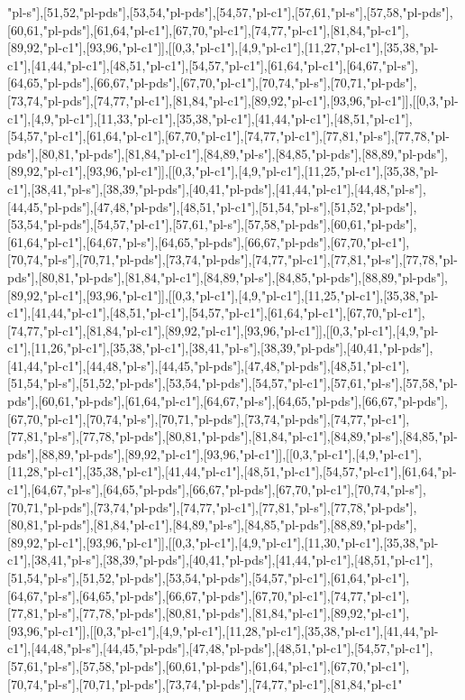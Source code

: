 "pl-s"],[51,52,"pl-pds"],[53,54,"pl-pds"],[54,57,"pl-c1"],[57,61,"pl-s"],[57,58,"pl-pds"],[60,61,"pl-pds"],[61,64,"pl-c1"],[67,70,"pl-c1"],[74,77,"pl-c1"],[81,84,"pl-c1"],[89,92,"pl-c1"],[93,96,"pl-c1"]],[[0,3,"pl-c1"],[4,9,"pl-c1"],[11,27,"pl-c1"],[35,38,"pl-c1"],[41,44,"pl-c1"],[48,51,"pl-c1"],[54,57,"pl-c1"],[61,64,"pl-c1"],[64,67,"pl-s"],[64,65,"pl-pds"],[66,67,"pl-pds"],[67,70,"pl-c1"],[70,74,"pl-s"],[70,71,"pl-pds"],[73,74,"pl-pds"],[74,77,"pl-c1"],[81,84,"pl-c1"],[89,92,"pl-c1"],[93,96,"pl-c1"]],[[0,3,"pl-c1"],[4,9,"pl-c1"],[11,33,"pl-c1"],[35,38,"pl-c1"],[41,44,"pl-c1"],[48,51,"pl-c1"],[54,57,"pl-c1"],[61,64,"pl-c1"],[67,70,"pl-c1"],[74,77,"pl-c1"],[77,81,"pl-s"],[77,78,"pl-pds"],[80,81,"pl-pds"],[81,84,"pl-c1"],[84,89,"pl-s"],[84,85,"pl-pds"],[88,89,"pl-pds"],[89,92,"pl-c1"],[93,96,"pl-c1"]],[[0,3,"pl-c1"],[4,9,"pl-c1"],[11,25,"pl-c1"],[35,38,"pl-c1"],[38,41,"pl-s"],[38,39,"pl-pds"],[40,41,"pl-pds"],[41,44,"pl-c1"],[44,48,"pl-s"],[44,45,"pl-pds"],[47,48,"pl-pds"],[48,51,"pl-c1"],[51,54,"pl-s"],[51,52,"pl-pds"],[53,54,"pl-pds"],[54,57,"pl-c1"],[57,61,"pl-s"],[57,58,"pl-pds"],[60,61,"pl-pds"],[61,64,"pl-c1"],[64,67,"pl-s"],[64,65,"pl-pds"],[66,67,"pl-pds"],[67,70,"pl-c1"],[70,74,"pl-s"],[70,71,"pl-pds"],[73,74,"pl-pds"],[74,77,"pl-c1"],[77,81,"pl-s"],[77,78,"pl-pds"],[80,81,"pl-pds"],[81,84,"pl-c1"],[84,89,"pl-s"],[84,85,"pl-pds"],[88,89,"pl-pds"],[89,92,"pl-c1"],[93,96,"pl-c1"]],[[0,3,"pl-c1"],[4,9,"pl-c1"],[11,25,"pl-c1"],[35,38,"pl-c1"],[41,44,"pl-c1"],[48,51,"pl-c1"],[54,57,"pl-c1"],[61,64,"pl-c1"],[67,70,"pl-c1"],[74,77,"pl-c1"],[81,84,"pl-c1"],[89,92,"pl-c1"],[93,96,"pl-c1"]],[[0,3,"pl-c1"],[4,9,"pl-c1"],[11,26,"pl-c1"],[35,38,"pl-c1"],[38,41,"pl-s"],[38,39,"pl-pds"],[40,41,"pl-pds"],[41,44,"pl-c1"],[44,48,"pl-s"],[44,45,"pl-pds"],[47,48,"pl-pds"],[48,51,"pl-c1"],[51,54,"pl-s"],[51,52,"pl-pds"],[53,54,"pl-pds"],[54,57,"pl-c1"],[57,61,"pl-s"],[57,58,"pl-pds"],[60,61,"pl-pds"],[61,64,"pl-c1"],[64,67,"pl-s"],[64,65,"pl-pds"],[66,67,"pl-pds"],[67,70,"pl-c1"],[70,74,"pl-s"],[70,71,"pl-pds"],[73,74,"pl-pds"],[74,77,"pl-c1"],[77,81,"pl-s"],[77,78,"pl-pds"],[80,81,"pl-pds"],[81,84,"pl-c1"],[84,89,"pl-s"],[84,85,"pl-pds"],[88,89,"pl-pds"],[89,92,"pl-c1"],[93,96,"pl-c1"]],[[0,3,"pl-c1"],[4,9,"pl-c1"],[11,28,"pl-c1"],[35,38,"pl-c1"],[41,44,"pl-c1"],[48,51,"pl-c1"],[54,57,"pl-c1"],[61,64,"pl-c1"],[64,67,"pl-s"],[64,65,"pl-pds"],[66,67,"pl-pds"],[67,70,"pl-c1"],[70,74,"pl-s"],[70,71,"pl-pds"],[73,74,"pl-pds"],[74,77,"pl-c1"],[77,81,"pl-s"],[77,78,"pl-pds"],[80,81,"pl-pds"],[81,84,"pl-c1"],[84,89,"pl-s"],[84,85,"pl-pds"],[88,89,"pl-pds"],[89,92,"pl-c1"],[93,96,"pl-c1"]],[[0,3,"pl-c1"],[4,9,"pl-c1"],[11,30,"pl-c1"],[35,38,"pl-c1"],[38,41,"pl-s"],[38,39,"pl-pds"],[40,41,"pl-pds"],[41,44,"pl-c1"],[48,51,"pl-c1"],[51,54,"pl-s"],[51,52,"pl-pds"],[53,54,"pl-pds"],[54,57,"pl-c1"],[61,64,"pl-c1"],[64,67,"pl-s"],[64,65,"pl-pds"],[66,67,"pl-pds"],[67,70,"pl-c1"],[74,77,"pl-c1"],[77,81,"pl-s"],[77,78,"pl-pds"],[80,81,"pl-pds"],[81,84,"pl-c1"],[89,92,"pl-c1"],[93,96,"pl-c1"]],[[0,3,"pl-c1"],[4,9,"pl-c1"],[11,28,"pl-c1"],[35,38,"pl-c1"],[41,44,"pl-c1"],[44,48,"pl-s"],[44,45,"pl-pds"],[47,48,"pl-pds"],[48,51,"pl-c1"],[54,57,"pl-c1"],[57,61,"pl-s"],[57,58,"pl-pds"],[60,61,"pl-pds"],[61,64,"pl-c1"],[67,70,"pl-c1"],[70,74,"pl-s"],[70,71,"pl-pds"],[73,74,"pl-pds"],[74,77,"pl-c1"],[81,84,"pl-c1"